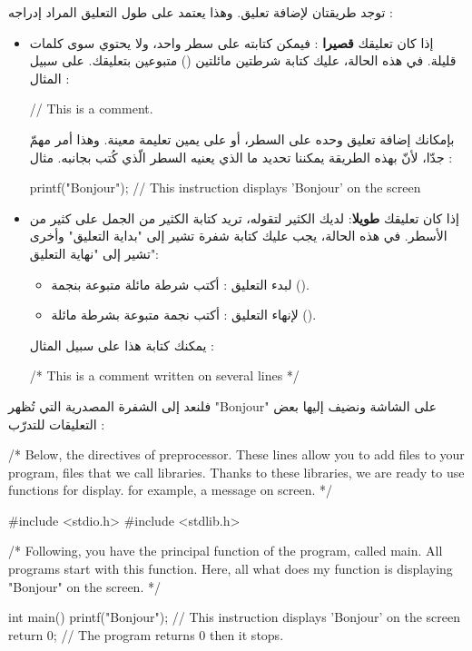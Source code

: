 توجد طريقتان لإضافة تعليق. وهذا يعتمد على طول التعليق المراد إدراجه :

\begin{itemize}
  \item إذا كان تعليقك
\textbf{قصيرا}
: فيمكن كتابته على سطر واحد، ولا يحتوي سوى كلمات قليلة. في هذه الحالة، عليك كتابة شرطتين مائلتين
(\InlineCode{//})
متبوعين بتعليقك. على سبيل المثال :

\begin{Csource}
// This is a comment.
\end{Csource}

بإمكانك إضافة تعليق وحده على السطر، أو على يمين تعليمة معينة. وهذا أمر مهمّ جدّا، لأنّ بهذه الطريقة يمكننا تحديد ما الذي يعنيه السطر الّذي كُتب بجانبه. مثال :

\begin{Csource}
printf("Bonjour"); // This instruction displays 'Bonjour' on the screen
\end{Csource}

  \item  إذا كان تعليقك
\textbf{طويلا}:
لديك الكثير لتقوله، تريد كتابة الكثير من الجمل على كثير من الأسطر. في هذه الحالة، يجب عليك كتابة شفرة تشير إلى "بداية التعليق" وأخرى تشير إلى "نهاية التعليق":

  \begin{itemize}
    \item لبدء التعليق : أكتب شرطة مائلة متبوعة بنجمة 
    (\InlineCode{/*}).
    \item لإنهاء التعليق : أكتب نجمة متبوعة بشرطة مائلة 
    (\InlineCode{*/}).
  \end{itemize}

  يمكنك كتابة هذا على سبيل المثال :
  
  \begin{Csource}
/* This is
a comment
written on several lines */
  \end{Csource}
\end{itemize}
فلنعد إلى الشفرة المصدرية التي تُظهر
"\textenglish{Bonjour}"
على الشاشة ونضيف إليها بعض التعليقات للتدرّب :

\begin{Csource}
/*
Below, the directives of preprocessor.
These lines allow you to add files to your program,
files that we call libraries. Thanks to these libraries, we are ready to use functions for display.
for example, a message on screen.
*/

#include <stdio.h>
#include <stdlib.h>

/*
Following, you have the principal function of the program, called main.
All programs start with this function.
Here, all what does my function is displaying "Bonjour" on the screen.
*/

int main()
{
  printf("Bonjour"); // This instruction displays 'Bonjour' on the screen
  return 0;          // The program returns 0 then it stops.
}
\end{Csource}

